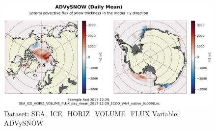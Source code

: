 \begin{figure}[H]
\centering
\includegraphics[scale=0.55]{../images/plots/native_plots/Sea-Ice_and_Snow_Horizontal_Volume_Fluxes/ADVySNOW.png}
\caption{Dataset: SEA\_ICE\_HORIZ\_VOLUME\_FLUX Variable: ADVySNOW}
\label{tab:table-SEA_ICE_HORIZ_VOLUME_FLUX_ADVySNOW-Plot}
\end{figure}
\pagebreak
